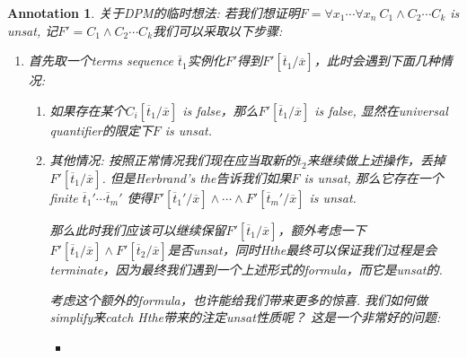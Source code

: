 \documentclass{article}
\theoremstyle{plain}
\newtheorem{annotation}[theorem]{Annotation}
\theoremstyle{nonumberplain}
\begin{document}
\begin{annotation}
\rm 关于DPM的临时想法: 若我们想证明$F = \forall x_1 \cdots \forall x_n~C_1 \wedge C_2 \cdots C_k$ is unsat, 记$F' =C_1 \wedge C_2 \cdots C_k $我们可以采取以下步骤:
\begin{enumerate}
	\item 首先取一个terms sequence $\overline{t}_1$实例化$F'$得到$F'[\overline{t}_1/\overline{x}]$，此时会遇到下面几种情况:
	\begin{enumerate}
		\item 如果存在某个$C_i[\overline{t}_1/\overline{x}]$ is false，那么$F'[\overline{t}_1/\overline{x}]$ is false, 显然在universal quantifier的限定下$F$ is unsat.
		\item 其他情况: 按照正常情况我们现在应当取新的$\overline{t}_2$来继续做上述操作，丢掉$F'[\overline{t}_1/\overline{x}]$. 但是Herbrand's the告诉我们如果$F$ is unsat, 那么它存在一个finite $\overline{t}_1'\cdots \overline{t}_m'$ 使得$F'[\overline{t}_1'/\overline{x}] \wedge \cdots \wedge F'[\overline{t}_m'/\overline{x}]$ is unsat. 
		
		那么此时我们应该可以继续保留$F'[\overline{t}_1/\overline{x}]$，额外考虑一下$F'[\overline{t}_1/\overline{x}] \wedge F'[\overline{t}_2/\overline{x}]$是否unsat，同时Hthe最终可以保证我们过程是会terminate，因为最终我们遇到一个上述形式的formula，而它是unsat的. 
		
		考虑这个额外的formula，也许能给我们带来更多的惊喜. 我们如何做simplify来catch Hthe带来的注定unsat性质呢？ 这是一个非常好的问题:
		\begin{itemize}
			\item 
		\end{itemize}
	\end{enumerate}
\end{enumerate}
\end{annotation}
\end{document}
